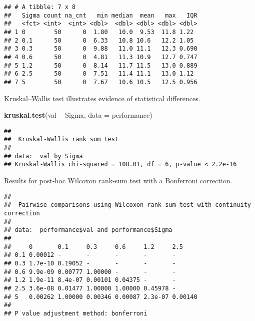 \documentclass[]{book}
\newenvironment{Shaded}{\begin{snugshade}}{\end{snugshade}}
\newcommand{\DataTypeTok}[1]{\textcolor[rgb]{0.13,0.29,0.53}{#1}}
\newcommand{\KeywordTok}[1]{\textcolor[rgb]{0.13,0.29,0.53}{\textbf{#1}}}
\newcommand{\NormalTok}[1]{#1}
\newcommand{\OperatorTok}[1]{\textcolor[rgb]{0.81,0.36,0.00}{\textbf{#1}}}
\newcommand{\OtherTok}[1]{\textcolor[rgb]{0.56,0.35,0.01}{#1}}
\newcommand{\StringTok}[1]{\textcolor[rgb]{0.31,0.60,0.02}{#1}}
\begin{document}
\begin{verbatim}
## # A tibble: 7 x 8
##   Sigma count na_cnt   min median  mean   max   IQR
##   <fct> <int>  <int> <dbl>  <dbl> <dbl> <dbl> <dbl>
## 1 0        50      0  1.80   10.0  9.53  11.8 1.22 
## 2 0.1      50      0  6.33   10.8 10.6   12.2 1.05 
## 3 0.3      50      0  9.88   11.0 11.1   12.3 0.690
## 4 0.6      50      0  4.81   11.3 10.9   12.7 0.747
## 5 1.2      50      0  8.14   11.7 11.5   13.0 0.889
## 6 2.5      50      0  7.51   11.4 11.1   13.0 1.12 
## 7 5        50      0  7.67   10.6 10.5   12.5 0.956
\end{verbatim}

Kruskal--Wallis test illustrates evidence of statistical differences.

\begin{Shaded}
\begin{Highlighting}[]
\KeywordTok{kruskal.test}\NormalTok{(val }\OperatorTok{~}\StringTok{ }\NormalTok{Sigma, }\DataTypeTok{data =}\NormalTok{ performance)}
\end{Highlighting}
\end{Shaded}

\begin{verbatim}
## 
##  Kruskal-Wallis rank sum test
## 
## data:  val by Sigma
## Kruskal-Wallis chi-squared = 108.01, df = 6, p-value < 2.2e-16
\end{verbatim}

Results for post-hoc Wilcoxon rank-sum test with a Bonferroni correction.

\begin{Shaded}
\end{Shaded}

\begin{verbatim}
## 
##  Pairwise comparisons using Wilcoxon rank sum test with continuity correction 
## 
## data:  performance$val and performance$Sigma 
## 
##     0       0.1     0.3     0.6     1.2     2.5    
## 0.1 0.00012 -       -       -       -       -      
## 0.3 1.7e-10 0.19052 -       -       -       -      
## 0.6 9.9e-09 0.00777 1.00000 -       -       -      
## 1.2 1.9e-11 8.4e-07 0.00101 0.04375 -       -      
## 2.5 3.6e-08 0.01477 1.00000 1.00000 0.45978 -      
## 5   0.00262 1.00000 0.00346 0.00087 2.3e-07 0.00140
## 
## P value adjustment method: bonferroni
\end{verbatim}
\end{document}
